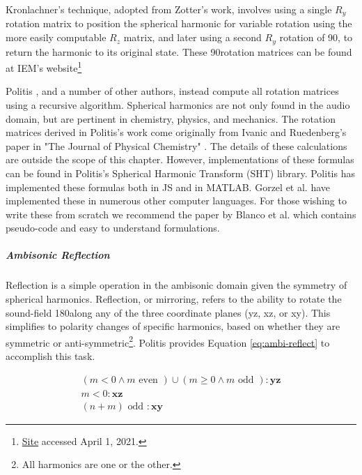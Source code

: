 Kronlachner's technique, adopted from Zotter's work, involves using a single $R_{y}$ rotation matrix to position the spherical harmonic for variable rotation using the more easily computable $R_{z}$ matrix, and later using a second $R_{y}$ rotation of 90\textdegree, to return the harmonic to its original state. These 90\textdegree rotation matrices can be found at IEM's website\footnote{\href{https://ambisonics.iem.at/xchange/fileformat/docs/spherical-harmonics-rotation}{Site} accessed April 1, 2021.}


Politis \cite{politis2016jsambisonics}, and a number of other authors, instead compute all rotation matrices using a recursive algorithm. Spherical harmonics are not only found in the audio domain, but are pertinent in chemistry, physics, and mechanics. The rotation matrices derived in Politis's work come originally from Ivanic and Ruedenberg's paper in "The Journal of Physical Chemistry" \cite{ivanic1996rotation}. 
The details of these calculations are outside the scope of this chapter. However, implementations of these formulas can be found in Politis's Spherical Harmonic Transform (SHT) library. Politis has implemented these formulas both in JS and in MATLAB. Gorzel et al. \cite{gorzel2019efficient} have implemented these in numerous other computer languages. For those wishing to write these from scratch we recommend the paper by Blanco et al. \cite{blanco1997evaluation} which contains pseudo-code and easy to understand formulations. 

\subparagraph{Ambisonic Reflection}

Reflection is a simple operation in the ambisonic domain given the symmetry of spherical harmonics. Reflection, or mirroring, refers to the ability to rotate the sound-field 180\textdegree along any of the three coordinate planes (yz, xz, or xy). This simplifies to polarity changes of specific harmonics, based on whether they are symmetric or anti-symmetric\footnote{All harmonics are one or the other.}. Politis provides Equation \ref{eq:ambi-reflect} to accomplish this task.

\begin{equation}
\begin{aligned}
(m<0 \wedge m \text { even }) \cup(m \geq 0 \wedge m \text { odd }):  \mathbf{y z}\\
m<0: \mathbf{x z}\\
(n+m) \text { odd }: \mathbf{x y} 
\end{aligned}
\label{eq:ambi-reflect}
\end{equation}

